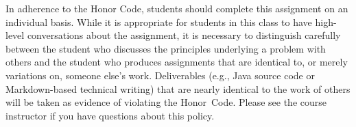\documentclass[11pt]{article}
\begin{document}
In adherence to the Honor Code, students should complete this assignment on an
individual basis. While it is appropriate for students in this class to have
high-level conversations about the assignment, it is necessary to distinguish
carefully between the student who discusses the principles underlying a problem
with others and the student who produces assignments that are identical to, or
merely variations on, someone else's work. Deliverables (e.g., Java source code
or Markdown-based technical writing) that are nearly identical to the work of
others will be taken as evidence of violating the \mbox{Honor Code}. Please see
the course instructor if you have questions about this policy.
\end{document}
